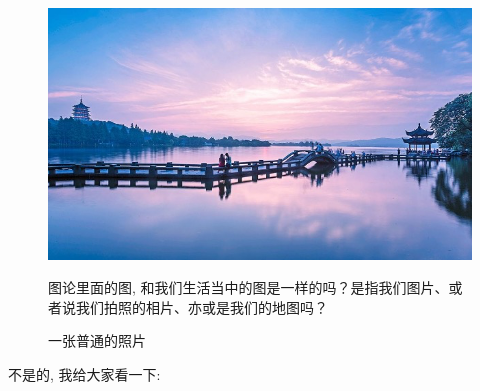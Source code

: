 \begin{figure}[ht]
  \centering
  \begin{minipage}[h]{0.4\textwidth}
    \includegraphics[width=\textwidth]{asset/03be564f-4ce8-45d1-acde-f8e0300c4e6f.png}
    \caption{一张普通的照片}
    \label{fig:img6_1}
  \end{minipage}%
  \hspace{3em}
  \begin{minipage}[h]{0.4\textwidth}
    图论里面的图, 和我们生活当中的图是一样的吗？是指我们图片、或者说我们拍照的相片、亦或是我们的地图吗？
  \end{minipage}
\end{figure}

不是的, 我给大家看一下: 

